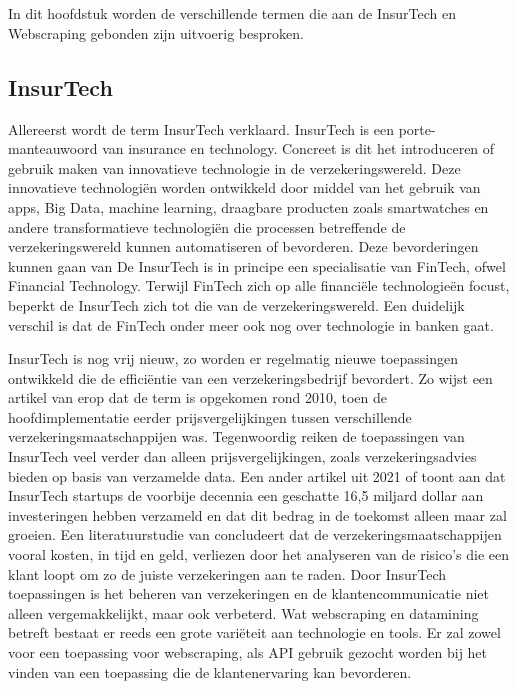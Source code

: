 \chapter{}
\label{ch:stand-van-zaken}



In dit hoofdstuk worden de verschillende termen die aan de InsurTech en Webscraping gebonden zijn uitvoerig besproken.

\section{InsurTech}

Allereerst wordt de term InsurTech verklaard.
InsurTech is een porte-manteauwoord van insurance en technology.
Concreet is dit het introduceren of gebruik maken van innovatieve technologie in de verzekeringswereld.
Deze innovatieve technologiën worden ontwikkeld door middel van het gebruik van apps, Big Data, machine learning, draagbare producten zoals smartwatches en andere transformatieve technologiën die processen betreffende de verzekeringswereld kunnen automatiseren of bevorderen. Deze bevorderingen kunnen gaan van 
De InsurTech is in principe een specialisatie van FinTech, ofwel Financial Technology.
Terwijl FinTech zich op alle financiële technologieën focust, beperkt de InsurTech zich tot die van de verzekeringswereld.
Een duidelijk verschil is dat de FinTech onder meer ook nog over technologie in banken gaat.

InsurTech is nog vrij nieuw, zo worden er regelmatig nieuwe toepassingen ontwikkeld die de efficiëntie van een verzekeringsbedrijf bevordert. Zo wijst een artikel van \textcite{Institute2020} erop dat de term is opgekomen rond 2010, toen de hoofdimplementatie eerder prijsvergelijkingen tussen verschillende verzekeringsmaatschappijen was. Tegenwoordig reiken de toepassingen van InsurTech veel verder dan alleen prijsvergelijkingen, zoals verzekeringsadvies bieden op basis van verzamelde data. Een ander artikel uit 2021 of \textcite{InsuranceCommissioners2021} toont aan dat InsurTech startups de voorbije decennia een geschatte 16,5 miljard dollar aan investeringen hebben verzameld en dat dit bedrag in de toekomst alleen maar zal groeien. Een literatuurstudie van \textcite{inproceedings} concludeert dat de verzekeringsmaatschappijen vooral kosten, in tijd en geld, verliezen door het analyseren van de risico’s die een klant loopt om zo de juiste verzekeringen aan te raden. Door InsurTech toepassingen is het beheren van verzekeringen en de klantencommunicatie niet alleen vergemakkelijkt, maar ook verbeterd. Wat webscraping en datamining betreft bestaat er reeds een grote variëteit aan technologie en tools. Er zal zowel voor een toepassing voor webscraping, als API gebruik gezocht worden bij het vinden van een toepassing die de klantenervaring kan bevorderen.


